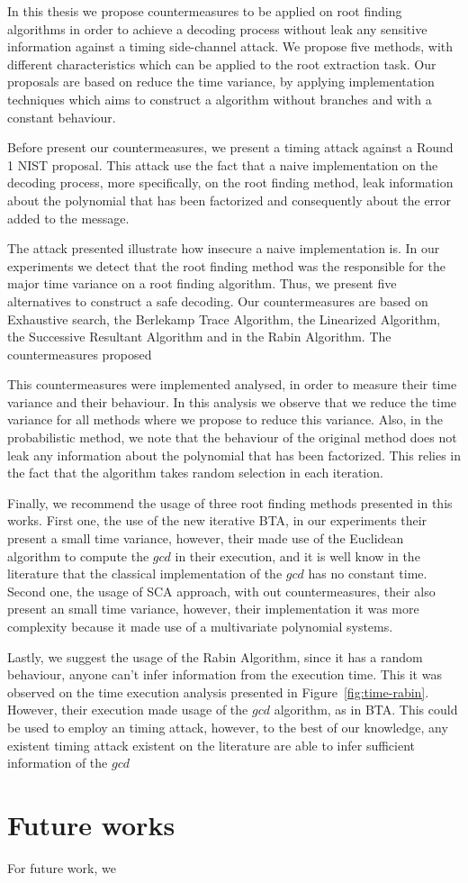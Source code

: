 In this thesis we propose countermeasures to be applied on root finding algorithms in order to achieve a decoding process without leak any sensitive information against a timing side-channel attack. We propose five methods, with different characteristics which can be applied to the root extraction task. Our proposals are based on reduce the time variance, by applying implementation techniques which aims to construct a algorithm without branches and with a constant behaviour. 

Before present our countermeasures, we present a timing attack against a Round 1 NIST proposal. This attack use the fact that a naive implementation on the decoding process, more specifically, on the root finding method, leak information about the polynomial that has been factorized and consequently about the error added to the message. 

The attack presented illustrate how insecure a naive implementation is. In our experiments we detect that the root finding method was the responsible for the major time variance on a root finding algorithm. Thus, we present five alternatives to construct a safe decoding. Our countermeasures are based on Exhaustive search, the Berlekamp Trace Algorithm, the Linearized Algorithm, the Successive Resultant Algorithm and in the Rabin Algorithm. The countermeasures proposed 

This countermeasures were implemented analysed, in order to measure their time variance and their behaviour. In this analysis we observe that we reduce the time variance for all methods where we propose to reduce this variance. Also, in the probabilistic method, we note that the behaviour of the original method does not leak any information about the polynomial that has been factorized. This relies in the fact that the algorithm takes random selection in each iteration.

Finally, we recommend the usage of three root finding methods presented in this works. First one, the use of the new iterative BTA, in our experiments their present a small time variance, however, their made use of the Euclidean algorithm to compute the $gcd$ in their execution, and it is well know in the literature that the classical implementation of the $gcd$ has no constant time. Second one, the usage of SCA approach, with out countermeasures, their also present an small time variance, however, their implementation it was more complexity because it made use of a multivariate polynomial systems.

Lastly, we suggest the usage of the Rabin Algorithm, since it has a random behaviour, anyone can't infer information from the execution time. This it was observed on the time execution analysis presented in Figure~\ref{fig:time-rabin}. However, their execution made usage of the $gcd$ algorithm, as in BTA. This could be used to employ an timing attack, however, to the best of our knowledge, any existent timing attack existent on the literature are able to infer sufficient information of the $gcd$

\section{Future works}
For future work, we 